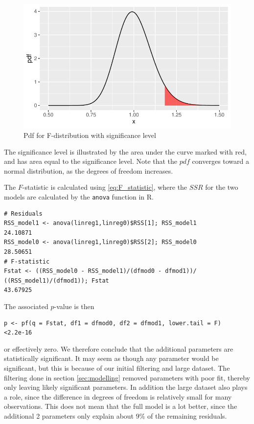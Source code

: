     
\begin{figure}[H]
    \centering
  \includegraphics[width = 0.7 \textwidth]{figures/Nanna/Fdistsign.pdf}
  \caption{Pdf for F-distribution with significance level}
  \label{fig:f_dist}
\end{figure}
    
The significance level is illustrated by the area under the curve marked with red, and has area equal to the significance level.
Note that the $pdf$ converges toward a normal distribution, as the degrees of freedom increases.
    
The $F$-statistic is calculated using \eqref{eq:F_statistic}, where the $SSR$ for the two models are calculated by the \texttt{anova} function in R. 
\begin{lstlisting}
# Residuals
RSS_model1 <- anova(linreg1,linreg0)$RSS[1]; RSS_model1
24.10871
RSS_model0 <- anova(linreg1,linreg0)$RSS[2]; RSS_model0
28.50651
# F-statistic
Fstat <- ((RSS_model0 - RSS_model1)/(dfmod0 - dfmod1))/
((RSS_model1)/(dfmod1)); Fstat
43.67925
\end{lstlisting}
The associated $p$-value is then
\begin{lstlisting}
p <- pf(q = Fstat, df1 = dfmod0, df2 = dfmod1, lower.tail = F)
<2.2e-16
\end{lstlisting}
or effectively zero. We therefore conclude that the additional parameters are statistically significant.
It may seem as though any parameter would be significant, but this is because of our initial filtering and large dataset.
The filtering done in section \ref{sec:modelling} removed parameters with poor fit, thereby only leaving likely significant parameters.
In addition the large dataset also plays a role, since the difference in degrees of freedom is relatively small for many observations. 
This does not mean that the full model is a lot better, since the additional 2 parameters only explain about $9\%$ of the remaining residuals. 

